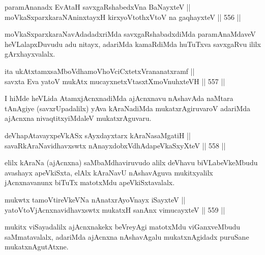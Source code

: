 \begin{shl}
paramAnanadx EvAtaH savxgaRshabedxVna BaNayxteV || \\
moVkaSxparxkaraNAninxtayxH kirxyoVtothxV\s toV na gaqhayxteV \hfill || 556 ||  
\end{shl}	

\begin{artha}
moVkaSxparxkaraNavAdadadxriMda savxgaRshabadxdiMda paramAnaMdaveV
heVLalapxDuvudu adu nitayx, adariMda kamaRdiMda huTuTxva savxgaRvu
ililx gArxhayxvalalx.
\end{artha}


\begin{shl}
ita ukAtxtamxsaMboVdhamoVhoVciCxtetxVrananatxramf || \\
savxta Eva yatoV mukAtx mucayxnetxV\s tasxtXmoVnuhxteVH \hfill || 557 ||  
\end{shl}

\begin{artha}
I hiMde heVLida AtamxjAcnxnadiMda ajAcnxnavu nAshavAda naMtara
tAnAgiye (savxrUpadalilx) yAva kAraNadiMda mukatxrAgiruvaroV adariMda
ajAcnxna nivaqtitxyiMdaleV mukatxrAguvaru.
\end{artha}

\begin{shl}
deVhapAtavayxpeVkASx sAyxdayxtarx kAraNasaMgatiH || \\
savaRkAraNavidhavxswtx nAnayxdobxVdhAdapeVkaSxyXteV \hfill || 558 ||  
\end{shl}

\begin{artha}
elilx kAraNa (ajAcnxna) saMbaMdhaviruvudo alilx deVhavu
biVLabeVkeMbudu avashayx apeVkiSxta, elAlx kAraNavU nAshavAguva
mukitxyalilx jAcnxnavanunx biTuTx matotxMdu apeVkiSxtavalalx.
\end{artha}

\begin{shl}
mukwtx tamoVtireVkeVNa nAnatxrAyoV\s nayx iSayxteV || \\
yatoV\s toV\s jAcnxnavidhavxswtx mukatxH sanAnx vimucayxteV \hfill || 559 ||  
\end{shl}

\begin{artha}
mukitx viSayadalilx ajAcnxnakekx beVreyAgi matotxMdu viGanxveMbudu
saMmatavalalx, adariMda ajAcnxna nAshavAgalu mukatxnAgidadx puruSane mukatxnAgutAtxne.
\end{artha}


